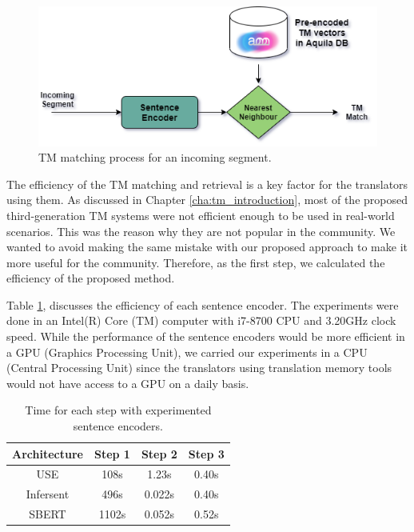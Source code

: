 	
	
	
	\begin{figure}[ht]
		\centering
		\includegraphics[scale=0.6]{figures/translation_memories/sentence_encoders/TM.png}
		\caption[TM Matching Process for an Incoming Segment]{TM matching process for an incoming segment.}
		\label{fig:TM}
	\end{figure}
	

The efficiency of the TM matching and retrieval is a key factor for the translators using them. As discussed in Chapter \ref{cha:tm_introduction}, most of the proposed third-generation TM systems were not efficient enough to be used in real-world scenarios. This was the reason why they are not popular in the community. We wanted to avoid making the same mistake with our proposed approach to make it more useful for the community. Therefore, as the first step, we calculated the efficiency of the proposed method. 

Table \ref{tab:tm_efficiency}, discusses the efficiency of each sentence encoder. The experiments were done in an Intel(R) Core (TM) computer with i7-8700  CPU and 3.20GHz clock speed. While the performance of the sentence encoders would be more efficient in a GPU (Graphics Processing Unit), we carried our experiments in a CPU (Central Processing Unit) since the translators using translation memory tools would not have access to a GPU on a daily basis. 


\begin{table}[t]
	\centering
		\begin{tabular}{|c|c|c|c|}
			\hline
			\textbf{Architecture} & \textbf{Step 1} & \textbf{Step 2} & \textbf{Step 3}\\ 
			\hline
			USE & 108s & 1.23s & 0.40s \\
			Infersent & 496s & 0.022s & 0.40s \\
			SBERT & 1102s & 0.052s & 0.52s \\
			\hline
		\end{tabular}
		\caption[Time for each step with experimented sentence encoders.]{Time for each step with experimented sentence encoders.}
		\label{tab:tm_efficiency}
\end{table}


